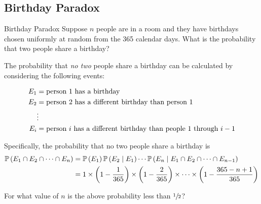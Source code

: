 \subsection{Birthday Paradox}
\begin{problem}{Birthday Paradox}{}
Suppose $n$ people are in a room and they have birthdays chosen uniformly at
random from the 365 calendar days. What is the probability that two people share
a birthday?
\end{problem}

The probability that \emph{no two} people share a birthday can be calculated by
considering the following events:

\begin{align*}
    E_1 &= \hbox{person 1 has a birthday}\\
    E_2 &= \hbox{person 2 has a different birthday than person 1}\\
    \phantom{..}&\vdots\\
    E_i &= \hbox{person $i$ has a different birthday than people 1 through $i - 1$}
\end{align*}

Specifically, the probability that no two people share a birthday is
\begin{align*}\operatorname{\mathbb{P}}\left(E_1 \cap E_2 \cap \dots \cap E_n\right)
    &= \operatorname{\mathbb{P}}\left(E_1\right)\operatorname{\mathbb{P}}\left(E_2 \mid E_1\right)\cdots \operatorname{\mathbb{P}}\left(E_n \mid E_1 \cap E_2 \cap \dots \cap E_{n - 1}\right)\\
    &= 1 \times \left(1 - \frac{1}{365}\right) \times \left(1 - \frac{2}{365}\right) \times \cdots \times \left(1 - \frac{365 - n + 1}{365}\right) 
\end{align*}

For what value of $n$ is the above probability less than $\sfrac{1}{2}$?